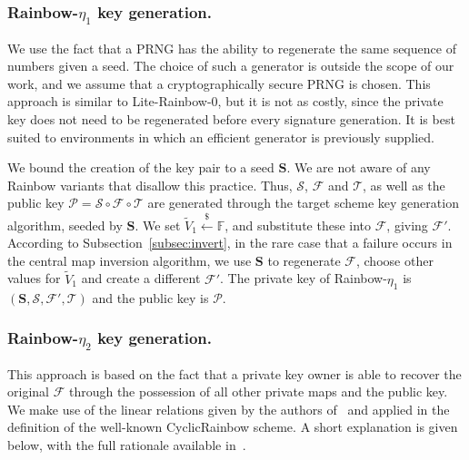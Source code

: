 \documentclass[draft, 12pt, a4paper, oneside]{memoir}
\newcommand{\random}{\stackrel{\$}{\longleftarrow}}
\theoremstyle{definition}
\theoremstyle{remark}
\begin{document}
\subsubsection{Rainbow-$\eta_{1}$ key generation.}

We use the fact that a PRNG has the ability to regenerate the same sequence of
numbers given a seed. The choice of such a generator is outside the scope of
our work, and we assume that a cryptographically secure PRNG is chosen. This
approach is similar to Lite-Rainbow-0, but it is not as costly, since the
private key does not need to be regenerated before every signature generation.
It is best suited to environments in which an efficient generator is previously
supplied.

We bound the creation of the key pair to a seed $\mathbf{S}$. We are not aware
of any Rainbow variants that disallow this practice. Thus, $\mathcal{S}$,
$\mathcal{F}$ and $\mathcal{T}$, as well as the public key
$\mathcal{P} = \mathcal{S} \circ \mathcal{F} \circ \mathcal{T}$ are generated
through the target scheme key generation algorithm, seeded by $\mathbf{S}$. We
set $\widetilde{V}_{1} \random{} \mathbb{F}$, and substitute these into
$\mathcal{F}$, giving $\mathcal{F}'$. According to
Subsection~\ref{subsec:invert}, in the rare case that a
failure occurs in the central map inversion algorithm, we use $\mathbf{S}$ to
regenerate $\mathcal{F}$, choose other values for $\widetilde{V}_{1}$ and
create a different $\mathcal{F}'$. The private key of Rainbow-$\eta_{1}$ is
$(\mathbf{S}, \mathcal{S}, \mathcal{F}', \mathcal{T})$ and the public key is
$\mathcal{P}$.

\subsubsection{Rainbow-$\eta_{2}$ key generation.}

This approach is based on the fact that a private key owner is able to recover
the original $\mathcal{F}$ through the possession of all other private maps and
the public key. We make use of the linear relations given by the authors
of~\cite{Petzoldt:201006} and applied in the definition of the
well-known CyclicRainbow scheme. A short explanation is given below, with the
full rationale available in~\cite[Chapter 7]{Petzoldt:201307}.
\end{document}
